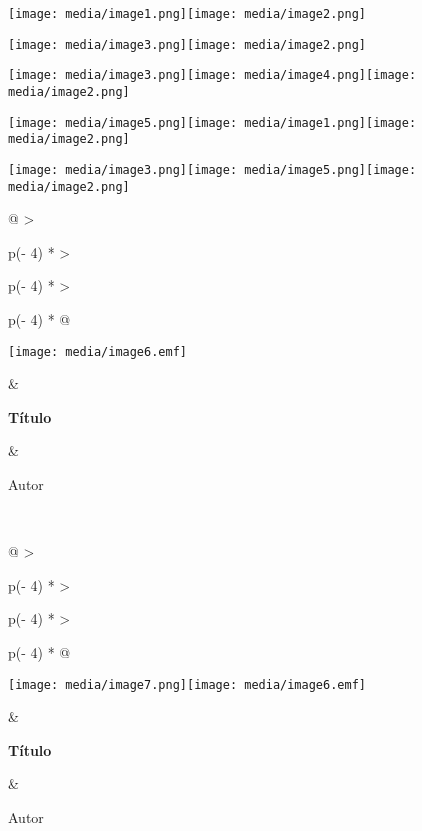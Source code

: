 \texttt{[image: media/image1.png]}\texttt{[image: media/image2.png]}

\texttt{[image: media/image3.png]}\texttt{[image: media/image2.png]}

\texttt{[image: media/image3.png]}\texttt{[image: media/image4.png]}\texttt{[image: media/image2.png]}

\texttt{[image: media/image5.png]}\texttt{[image: media/image1.png]}\texttt{[image: media/image2.png]}

\texttt{[image: media/image3.png]}\texttt{[image: media/image5.png]}\texttt{[image: media/image2.png]}

\begin{longtable}[]{@{}
  >{\raggedright\arraybackslash}p{(\columnwidth - 4\tabcolsep) * }
  >{\raggedright\arraybackslash}p{(\columnwidth - 4\tabcolsep) * }
  >{\raggedright\arraybackslash}p{(\columnwidth - 4\tabcolsep) * }@{}}
\toprule
\begin{minipage}[b]{\linewidth}\raggedright
\texttt{[image: media/image6.emf]}
\end{minipage} & \begin{minipage}[b]{\linewidth}\raggedright
\textbf{Título}
\end{minipage} & \begin{minipage}[b]{\linewidth}\raggedright
Autor
\end{minipage} \\
\midrule
\endhead
\bottomrule
\end{longtable}

\begin{longtable}[]{@{}
  >{\raggedright\arraybackslash}p{(\columnwidth - 4\tabcolsep) * }
  >{\raggedright\arraybackslash}p{(\columnwidth - 4\tabcolsep) * }
  >{\raggedright\arraybackslash}p{(\columnwidth - 4\tabcolsep) * }@{}}
\toprule
\begin{minipage}[b]{\linewidth}\raggedright
\texttt{[image: media/image7.png]}\texttt{[image: media/image6.emf]}
\end{minipage} & \begin{minipage}[b]{\linewidth}\raggedright
\textbf{Título}
\end{minipage} & \begin{minipage}[b]{\linewidth}\raggedright
Autor
\end{minipage} \\
\midrule
\endhead
\bottomrule
\end{longtable}
